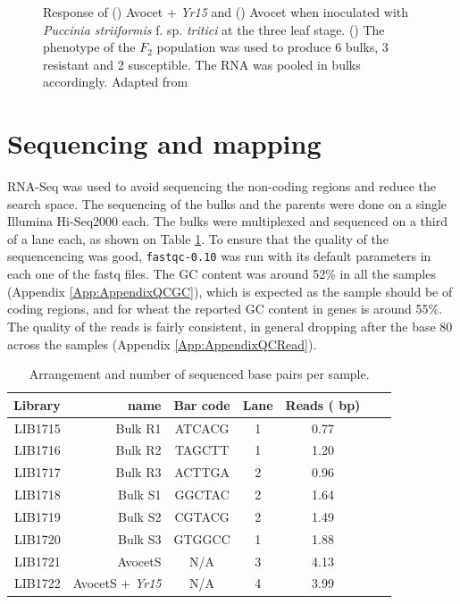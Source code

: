 \begin{figure}
    \caption{Response of () Avocet + \textit{Yr15} and () Avocet when inoculated with \textit{Puccinia striiformis} f. sp.  \textit{tritici} at the three leaf stage. () The phenotype of the $F_{2}$ population was used to produce 6 bulks, 3 resistant and 2 susceptible. The RNA was pooled in bulks accordingly. Adapted from \citep{Ramirez-Gonzalez2015b}}

\end{figure}


\section{Sequencing and mapping} 

RNA-Seq was used to avoid sequencing the non-coding regions and reduce the search space.  
The sequencing of the bulks and the parents were done on a single Illumina Hi-Seq2000 each.
The bulks were multiplexed and sequenced on a third of a lane each, as shown on Table \ref{tab:yr15:reads}. 
To ensure that the quality of the sequencencing was good, \verb|fastqc-0.10| \citep{fastqc}  was run with its default parameters in each one of the fastq files.  
The GC content was around 52\% in all the samples (Appendix \ref{App:AppendixQCGC}), which is expected as the sample should be of coding regions, and for wheat the reported GC content in genes is around 55\%.  
The quality of the reads is fairly consistent, in general dropping after the base 80 across the samples (Appendix \ref{App:AppendixQCRead}). 
\label{yr15:sequencing}

\begin{table}
\centering
\caption{Arrangement and number of sequenced base pairs per sample. }
\label{tab:yr15:reads}
\begin{tabular}{rrccccc}
\toprule
Library & name & Bar code & Lane   &  Reads (\e{8} bp)\\ 
\midrule
LIB1715 & Bulk R1 & ATCACG & 1  & 0.77\\
LIB1716 & Bulk R2 & TAGCTT & 1    & 1.20\\
LIB1717 & Bulk R3 & ACTTGA & 2  & 0.96  \\ 
LIB1718 & Bulk S1 & GGCTAC & 2  & 1.64   \\ 
LIB1719 & Bulk S2 & CGTACG & 2  & 1.49  \\ 
LIB1720 & Bulk S3 & GTGGCC & 1  &1.88  \\ 
LIB1721 & AvocetS & N/A & 3     & 4.13 \\ 
LIB1722 & AvocetS + \textit{Yr15} & N/A & 4   & 3.99  \\ 
\bottomrule
\end{tabular}
\end{table}



